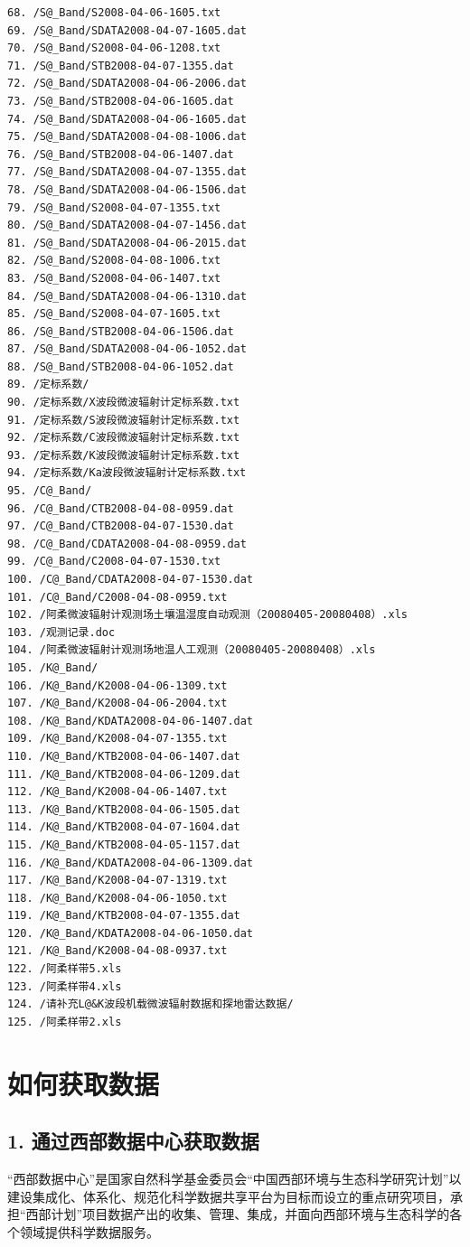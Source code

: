 \documentclass[letterpaper,10pt,english]{sphinxmanual}
\begin{document}
\begin{Verbatim}[commandchars=@\[\]]
68. /S@_Band/S2008-04-06-1605.txt
69. /S@_Band/SDATA2008-04-07-1605.dat
70. /S@_Band/S2008-04-06-1208.txt
71. /S@_Band/STB2008-04-07-1355.dat
72. /S@_Band/SDATA2008-04-06-2006.dat
73. /S@_Band/STB2008-04-06-1605.dat
74. /S@_Band/SDATA2008-04-06-1605.dat
75. /S@_Band/SDATA2008-04-08-1006.dat
76. /S@_Band/STB2008-04-06-1407.dat
77. /S@_Band/SDATA2008-04-07-1355.dat
78. /S@_Band/SDATA2008-04-06-1506.dat
79. /S@_Band/S2008-04-07-1355.txt
80. /S@_Band/SDATA2008-04-07-1456.dat
81. /S@_Band/SDATA2008-04-06-2015.dat
82. /S@_Band/S2008-04-08-1006.txt
83. /S@_Band/S2008-04-06-1407.txt
84. /S@_Band/SDATA2008-04-06-1310.dat
85. /S@_Band/S2008-04-07-1605.txt
86. /S@_Band/STB2008-04-06-1506.dat
87. /S@_Band/SDATA2008-04-06-1052.dat
88. /S@_Band/STB2008-04-06-1052.dat
89. /定标系数/
90. /定标系数/X波段微波辐射计定标系数.txt
91. /定标系数/S波段微波辐射计定标系数.txt
92. /定标系数/C波段微波辐射计定标系数.txt
93. /定标系数/K波段微波辐射计定标系数.txt
94. /定标系数/Ka波段微波辐射计定标系数.txt
95. /C@_Band/
96. /C@_Band/CTB2008-04-08-0959.dat
97. /C@_Band/CTB2008-04-07-1530.dat
98. /C@_Band/CDATA2008-04-08-0959.dat
99. /C@_Band/C2008-04-07-1530.txt
100. /C@_Band/CDATA2008-04-07-1530.dat
101. /C@_Band/C2008-04-08-0959.txt
102. /阿柔微波辐射计观测场土壤温湿度自动观测（20080405-20080408）.xls
103. /观测记录.doc
104. /阿柔微波辐射计观测场地温人工观测（20080405-20080408）.xls
105. /K@_Band/
106. /K@_Band/K2008-04-06-1309.txt
107. /K@_Band/K2008-04-06-2004.txt
108. /K@_Band/KDATA2008-04-06-1407.dat
109. /K@_Band/K2008-04-07-1355.txt
110. /K@_Band/KTB2008-04-06-1407.dat
111. /K@_Band/KTB2008-04-06-1209.dat
112. /K@_Band/K2008-04-06-1407.txt
113. /K@_Band/KTB2008-04-06-1505.dat
114. /K@_Band/KTB2008-04-07-1604.dat
115. /K@_Band/KTB2008-04-05-1157.dat
116. /K@_Band/KDATA2008-04-06-1309.dat
117. /K@_Band/K2008-04-07-1319.txt
118. /K@_Band/K2008-04-06-1050.txt
119. /K@_Band/KTB2008-04-07-1355.dat
120. /K@_Band/KDATA2008-04-06-1050.dat
121. /K@_Band/K2008-04-08-0937.txt
122. /阿柔样带5.xls
123. /阿柔样带4.xls
124. /请补充L@&K波段机载微波辐射数据和探地雷达数据/
125. /阿柔样带2.xls
\end{Verbatim}


\chapter{如何获取数据}
\label{data_acquire:id1}\label{data_acquire::doc}\label{data_acquire:data-acquire}

\section{1. 通过西部数据中心获取数据}
\label{data_acquire:id2}
“西部数据中心”是国家自然科学基金委员会“中国西部环境与生态科学研究计划”以建设集成化、体系化、规范化科学数据共享平台为目标而设立的重点研究项目，承担“西部计划”项目数据产出的收集、管理、集成，并面向西部环境与生态科学的各个领域提供科学数据服务。
\end{document}
